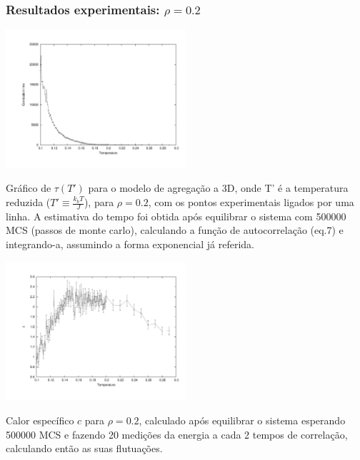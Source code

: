 \documentclass[a4paper,10pt]{article}
\makeatletter
\newenvironment{figurehere}
  {\def\@captype{figure}}
  {}
\makeatother
\begin{document}
\begin{multicols}{2}
\subsubsection{Resultados experimentais: $\rho=0.2$}

\begin{figurehere}
	\centering
		\includegraphics[width=0.5\textwidth, clip, trim = 1.7cm 1.5cm 1cm 1cm]{images/ctimes2}
	\caption{{\footnotesize Gráfico de $\tau(T')$ para o modelo de agregação a 3D, onde T' é a temperatura reduzida ($T'\equiv\frac{k_b T}{J}$), para $\rho = 0.2$, com os pontos experimentais ligados por uma linha. A estimativa do tempo foi obtida após equilibrar o sistema com 500000 MCS (passos de monte carlo), calculando a função de autocorrelação (eq.7) e integrando-a, assumindo a forma exponencial já referida.}}
	\label{fig:14}
\end{figurehere}

\begin{figurehere}
	\centering
		\includegraphics[width=0.5\textwidth, clip, trim = 1.7cm 1.5cm 1cm 1cm]{images/0.2/c}
	\caption{{\footnotesize Calor específico $c$ para $\rho = 0.2$, calculado após equilibrar o sistema esperando 500000 MCS e fazendo 20 medições da energia a cada 2 tempos de correlação, calculando então as suas flutuações.}}
	\label{fig:15}
\end{figurehere}


\end{multicols}
\end{document}
